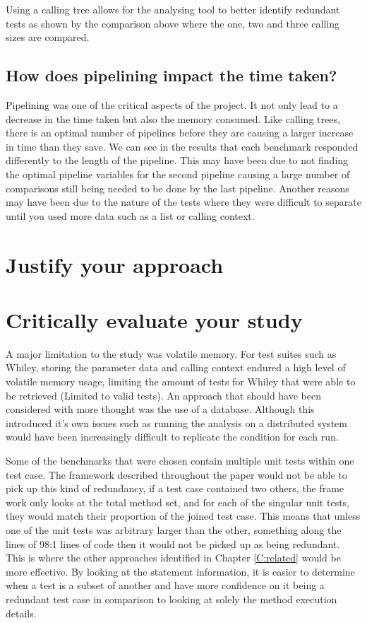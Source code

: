 Using a calling tree allows for the analysing tool to better identify redundant tests as shown by the comparison above where the one, two and three calling sizes are compared.

\subsection{How does pipelining impact the time taken?}

Pipelining was one of the critical aspects of the project. It not only lead to a decrease in the time taken but also the memory consumed. Like calling trees, there is an optimal number of pipelines before they are causing a larger increase in time than they save. We can see in the results that each  benchmark responded differently to the length of the pipeline. This may have been due to not finding the optimal pipeline variables for the second pipeline causing a large number of comparisons still being needed to be done by the last pipeline. Another reasons may have been due to the nature of the tests where they were difficult to separate until you used more data such as a list or calling context. 

\section{Justify your approach}




\section{Critically evaluate your study}

A major limitation to the study was volatile memory. For test suites such as Whiley, storing the parameter data and calling context endured a high level of volatile memory usage, limiting the amount of tests for Whiley that were able to be retrieved (Limited to valid tests). An approach that should have been considered with more thought was the use of a database. Although this introduced it's own issues such as running the analysis on a distributed system would have been increasingly difficult to replicate the condition for each run. 

Some of the benchmarks that were chosen contain multiple unit tests within one test case. The framework described throughout the paper would not be able to pick up this kind of redundancy, if a test case contained two others, the frame work only looks at the total method set, and for each of the singular unit tests, they would match their proportion of the joined test case. This means that unless one of the unit tests was arbitrary larger than the other, something along the lines of 98:1 lines of code then it would not be picked up as being redundant. This is where the other approaches identified in Chapter \ref{C:related} would be more effective. By looking at the statement information, it is easier to determine when a test is a subset of another and have more confidence on it being a redundant test case in comparison to looking at solely the method execution details. 
